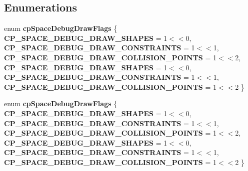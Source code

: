 \subsection*{Enumerations}
\begin{DoxyCompactItemize}
\item 
\mbox{\label{group__cpSpace_ga12b09b00b23e09d770e4b2ab3980c69a}} 
enum {\bfseries cp\+Space\+Debug\+Draw\+Flags} \{ \newline
{\bfseries C\+P\+\_\+\+S\+P\+A\+C\+E\+\_\+\+D\+E\+B\+U\+G\+\_\+\+D\+R\+A\+W\+\_\+\+S\+H\+A\+P\+ES} = 1$<$$<$0, 
{\bfseries C\+P\+\_\+\+S\+P\+A\+C\+E\+\_\+\+D\+E\+B\+U\+G\+\_\+\+D\+R\+A\+W\+\_\+\+C\+O\+N\+S\+T\+R\+A\+I\+N\+TS} = 1$<$$<$1, 
{\bfseries C\+P\+\_\+\+S\+P\+A\+C\+E\+\_\+\+D\+E\+B\+U\+G\+\_\+\+D\+R\+A\+W\+\_\+\+C\+O\+L\+L\+I\+S\+I\+O\+N\+\_\+\+P\+O\+I\+N\+TS} = 1$<$$<$2, 
{\bfseries C\+P\+\_\+\+S\+P\+A\+C\+E\+\_\+\+D\+E\+B\+U\+G\+\_\+\+D\+R\+A\+W\+\_\+\+S\+H\+A\+P\+ES} = 1$<$$<$0, 
\newline
{\bfseries C\+P\+\_\+\+S\+P\+A\+C\+E\+\_\+\+D\+E\+B\+U\+G\+\_\+\+D\+R\+A\+W\+\_\+\+C\+O\+N\+S\+T\+R\+A\+I\+N\+TS} = 1$<$$<$1, 
{\bfseries C\+P\+\_\+\+S\+P\+A\+C\+E\+\_\+\+D\+E\+B\+U\+G\+\_\+\+D\+R\+A\+W\+\_\+\+C\+O\+L\+L\+I\+S\+I\+O\+N\+\_\+\+P\+O\+I\+N\+TS} = 1$<$$<$2
 \}
\item 
\mbox{\label{group__cpSpace_ga12b09b00b23e09d770e4b2ab3980c69a}} 
enum {\bfseries cp\+Space\+Debug\+Draw\+Flags} \{ \newline
{\bfseries C\+P\+\_\+\+S\+P\+A\+C\+E\+\_\+\+D\+E\+B\+U\+G\+\_\+\+D\+R\+A\+W\+\_\+\+S\+H\+A\+P\+ES} = 1$<$$<$0, 
{\bfseries C\+P\+\_\+\+S\+P\+A\+C\+E\+\_\+\+D\+E\+B\+U\+G\+\_\+\+D\+R\+A\+W\+\_\+\+C\+O\+N\+S\+T\+R\+A\+I\+N\+TS} = 1$<$$<$1, 
{\bfseries C\+P\+\_\+\+S\+P\+A\+C\+E\+\_\+\+D\+E\+B\+U\+G\+\_\+\+D\+R\+A\+W\+\_\+\+C\+O\+L\+L\+I\+S\+I\+O\+N\+\_\+\+P\+O\+I\+N\+TS} = 1$<$$<$2, 
{\bfseries C\+P\+\_\+\+S\+P\+A\+C\+E\+\_\+\+D\+E\+B\+U\+G\+\_\+\+D\+R\+A\+W\+\_\+\+S\+H\+A\+P\+ES} = 1$<$$<$0, 
\newline
{\bfseries C\+P\+\_\+\+S\+P\+A\+C\+E\+\_\+\+D\+E\+B\+U\+G\+\_\+\+D\+R\+A\+W\+\_\+\+C\+O\+N\+S\+T\+R\+A\+I\+N\+TS} = 1$<$$<$1, 
{\bfseries C\+P\+\_\+\+S\+P\+A\+C\+E\+\_\+\+D\+E\+B\+U\+G\+\_\+\+D\+R\+A\+W\+\_\+\+C\+O\+L\+L\+I\+S\+I\+O\+N\+\_\+\+P\+O\+I\+N\+TS} = 1$<$$<$2
 \}
\end{DoxyCompactItemize}
